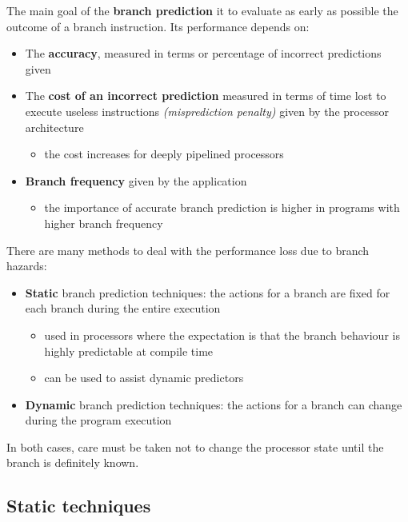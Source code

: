 \documentclass[english]{article}
\begin{document}
The main goal of the \textbf{branch prediction} it to evaluate as early as possible the outcome of a branch instruction.
Its performance depends on:

\begin{itemize}
  \item The \textbf{accuracy}, measured in terms or percentage of incorrect predictions given
  \item The \textbf{cost of an incorrect prediction} measured in terms of time lost to execute useless instructions \textit{(misprediction penalty)} given by the processor architecture
        \begin{itemize}
          \item the cost increases for deeply pipelined processors
        \end{itemize}
  \item \textbf{Branch frequency} given by the application
        \begin{itemize}
          \item the importance of accurate branch prediction is higher in programs with higher branch frequency
        \end{itemize}
\end{itemize}

There are many methods to deal with the performance loss due to branch hazards:

\begin{itemize}
  \item \textbf{Static} branch prediction techniques: the actions for a branch are fixed for each branch during the entire execution
        \begin{itemize}
          \item used in processors where the expectation is that the branch behaviour is highly predictable at compile time
          \item can be used to assist dynamic predictors
        \end{itemize}
  \item \textbf{Dynamic} branch prediction techniques: the actions for a branch can change during the program execution
\end{itemize}

In both cases, care must be taken not to change the processor state until the branch is definitely known.

\subsection{Static techniques}
\end{document}
